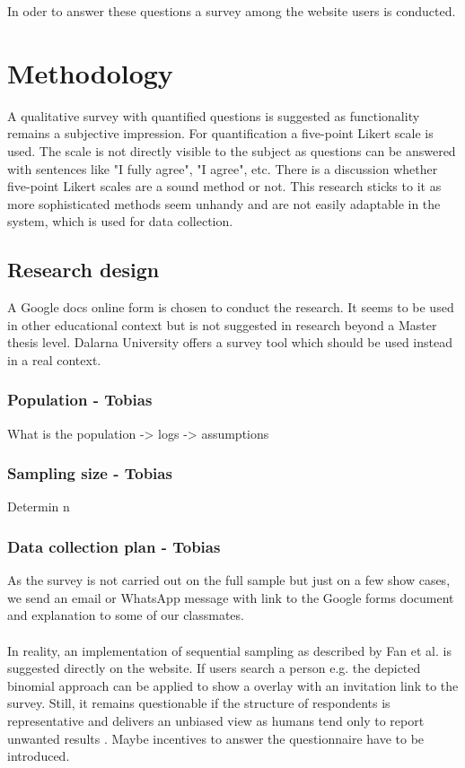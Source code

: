 \documentclass[12pt,a4paper,paper=a4,oneside,titlepage,pdftex]{scrartcl}
\begin{document}
In oder to answer these questions a survey among the website users is conducted.

\section{Methodology}
A qualitative survey \cite{sofaer1999qualitative} with quantified questions is suggested as functionality remains a subjective impression. For quantification a five-point Likert scale \cite{likert1932technique} is used. The scale is not directly visible to the subject as questions can be answered with sentences like "I fully agree", "I agree", etc. There is a discussion \cite{cummins2000we} whether five-point Likert scales are a sound method or not. This research sticks to it as more sophisticated methods \cite{chimi2009likert} seem unhandy and are not easily adaptable in the system, which is used for data collection.

\subsection{Research design}
A Google docs online form is chosen to conduct the research. It seems to be used in other educational context \cite{gehringer2010daily} but is not suggested in research beyond a Master thesis level. Dalarna University offers a survey tool which should be used instead in a real context.

\subsubsection{Population - Tobias}
What is the population -> logs -> assumptions

\subsubsection{Sampling size - Tobias}
Determin n

\subsubsection{Data collection plan - Tobias}
As the survey is not carried out on the full sample but just on a few show cases, we send an email or WhatsApp message with link to the Google forms document and explanation to some of our classmates.
\\ \\
In reality, an implementation of sequential sampling as described by Fan et al. \cite{fan1962development} is suggested directly on the website. If users search a person e.g. the depicted binomial approach can be applied to show a overlay with an invitation link to the survey. Still, it remains questionable if the structure of respondents is representative and delivers an unbiased view as humans tend only to report unwanted results \cite{bergstrand1983bias}. Maybe incentives to answer the questionnaire have to be introduced.
\end{document}
